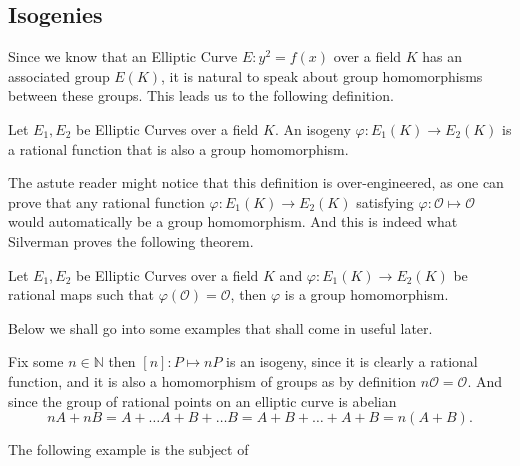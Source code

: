 \subsection{Isogenies}%
\label{sub:isogenies}
Since we know that an Elliptic Curve $E: y^2 = f(x)$ over a
field $K$ has an associated group $E(K)$, it is natural
to speak about group homomorphisms between these groups.
This leads us to the following definition.
\begin{definition} \label{def:isogeny}
  Let $E_1, E_2$ be Elliptic Curves over a field $K$.
  An isogeny $\varphi: E_1(K) \to E_2(K)$ is a rational function
  that is also a group homomorphism.
\end{definition}
The astute reader might notice that this definition is
over-engineered, as one can prove that any rational function
$\varphi: E_1(K) \to E_2(K)$ satisfying $\varphi: \mathcal{O} \mapsto \mathcal{O}$
would automatically be a group homomorphism. And this is indeed what
Silverman proves \cite[Theorem III.4.8]{silvermanRationalPoints}
the following theorem.
\begin{theorem} \label{thm:rationalMapsAreIsogeny}
  Let $E_1, E_2$ be Elliptic Curves over a field $K$
  and $\varphi: E_1(K) \to E_2(K)$ be rational maps
  such that $\varphi(\mathcal{O}) = \mathcal{O}$,
  then $\varphi$ is a group homomorphism.
\end{theorem}
Below we shall go into some examples
that shall come in useful later.
\begin{example} \label{ex:multiplicationIsogeny}
  Fix some $n \in \mathbb{N}$ then $[n]: P \mapsto nP$ is an isogeny, since
  it is clearly a rational function, and it is also a homomorphism
  of groups as by definition $n \mathcal{O} = \mathcal{O}$. And since
  the group of rational points on an elliptic curve is abelian
  \[ nA + nB = A + \dots A + B + \dots B = A + B + \dots + A + B = n(A+B). \]
\end{example}
The following example is the subject of \cite[chapter 2.2]{moniqueThesis}
